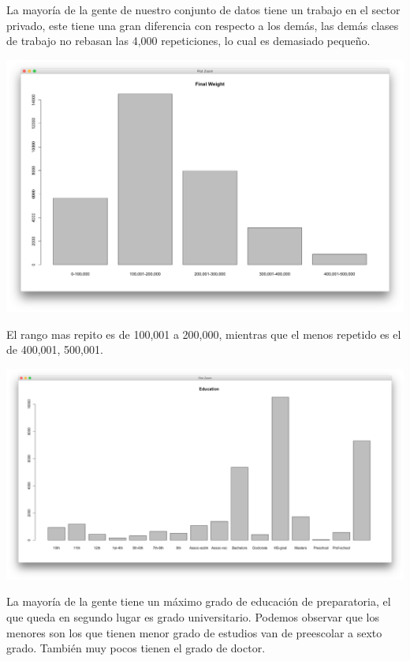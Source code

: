 \documentclass{article}
\begin{document}
  La mayoría de la gente de nuestro conjunto de datos tiene un trabajo en el sector privado, este tiene una gran diferencia con respecto a los demás, las demás clases de trabajo no rebasan las 4,000 repeticiones, lo cual es demasiado pequeño.
  \begin{center}
    \hbox{\hspace{-5.5em}\includegraphics[scale=0.4]{graficas/fnlwgtP}}
  \end{center}
  El rango mas repito es de 100,001 a 200,000, mientras que el menos repetido es el de 400,001, 500,001.
  \begin{center}
    \hbox{\hspace{-5.5em}\includegraphics[scale=0.4]{graficas/educationP}}
  \end{center}
  La mayoría de la gente tiene un máximo grado de educación de  preparatoria, el que queda en segundo lugar es grado universitario. Podemos observar que los menores son los que tienen menor grado de estudios van de preescolar a sexto grado. También muy pocos tienen el grado de doctor.
\end{document}

